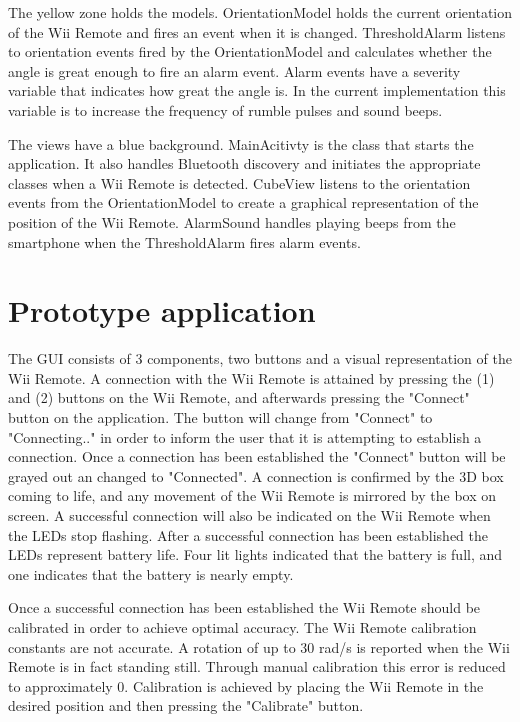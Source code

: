 The yellow zone holds the models. OrientationModel holds the current orientation of the Wii Remote and fires an event when it is changed. ThresholdAlarm listens to orientation events fired by the OrientationModel and calculates whether the angle is great enough to fire an alarm event. Alarm events have a severity variable that indicates how great the angle is. In the current implementation this variable is to increase the frequency of rumble pulses and sound beeps.

The views have a blue background. MainAcitivty is the class that starts the application. It also handles Bluetooth discovery and initiates the appropriate classes when a Wii Remote is detected. CubeView listens to the orientation events from the OrientationModel to create a graphical representation of the position of the Wii Remote. AlarmSound handles playing beeps from the smartphone when the ThresholdAlarm fires alarm events. 

\section{Prototype application}
The GUI consists of 3 components, two buttons and a visual representation of the Wii Remote. A connection with the Wii Remote is attained by pressing the (1) and (2) buttons on the Wii Remote, and afterwards pressing the "Connect" button on the application. The button will change from "Connect" to "Connecting.." in order to inform the user that it is attempting to establish a connection. Once a connection has been established the "Connect" button will be grayed out an changed to "Connected". A connection is confirmed by the 3D box coming to life, and any movement of the Wii Remote is mirrored by the box on screen. A successful connection will also be indicated on the Wii Remote when the LEDs stop flashing. After a successful connection has been established the LEDs represent battery life. Four lit lights indicated that the battery is full, and one indicates that the battery is nearly empty.

Once a successful connection has been established the Wii Remote should be calibrated in order to achieve optimal accuracy. The Wii Remote calibration constants are not accurate. A rotation of up to 30 rad/s is reported when the Wii Remote is in fact standing still. Through manual calibration this error is reduced to approximately 0. Calibration is achieved by placing the Wii Remote in the desired position and then pressing the "Calibrate" button.

